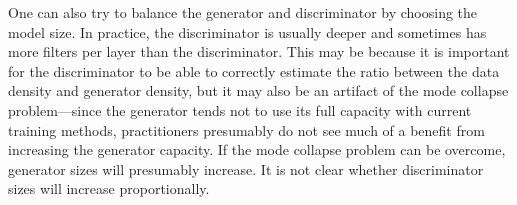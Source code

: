 One can also try to balance the generator and discriminator by choosing the model
size.
In practice, the discriminator is usually deeper and sometimes has more filters
per layer than the discriminator.
This may be because it is important for the discriminator to be able to correctly
estimate the ratio between the data density and generator density, but it may
also be an artifact of the mode collapse problem---since the generator tends not
to use its full capacity with current training methods, practitioners presumably
do not see much of a benefit from increasing the generator capacity.
If the mode collapse problem can be overcome, generator sizes will presumably
increase. It is not clear whether discriminator sizes will increase proportionally.


